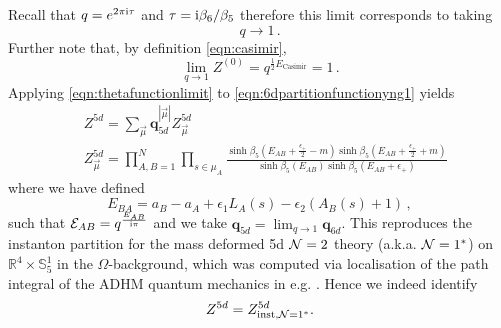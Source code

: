 \documentclass[main.tex]{subfiles}
\begin{document}
Recall that $q=e^{2\pi\mathrm{i}\tau}$ and $\tau=\mathrm{i}\beta_6/\beta_5$ therefore this limit corresponds to taking
\begin{equation}
q\to1\,.
\end{equation}
Further note that, by definition \eqref{eqn:casimir}, 
\begin{equation}
\lim_{q\to1}Z^{(0)}=q^{\frac{1}{2}E_{\text{Casimir}}}=1\,.
\end{equation}
Applying \eqref{eqn:thetafunctionlimit} to \eqref{eqn:6dpartitionfunctionyng1} yields
\begin{align}
&Z^{5d}=\sum_{\vec{\mu}}\mathbf{q}_{5d}^{|\vec{\mu}|}Z_{\vec{\mu}}^{5d}\\
&Z_{\vec{\mu}}^{5d}=\prod_{A,B=1}^N\prod_{s\in \mu_A}\frac{\sinh\beta_5\left(E_{AB}+\frac{\epsilon_+}{2}-m\right)\sinh\beta_5\left(E_{AB}+\frac{\epsilon_+}{2}+m\right)}{\sinh\beta_5\left(E_{AB}\right)\sinh\beta_5\left(E_{AB}+\epsilon_+\right)}\label{5dpartitionfunctionyng}
\end{align}
where we have defined
\begin{equation}
E_{BA}=a_B-a_A+\epsilon_1L_A(s)-\epsilon_2\left(A_B(s)+1\right)\,,
\end{equation}
such that $\mathcal{E}_{AB}=q^{\frac{E_{AB}}{\mathrm{i}\pi}}$ and we take $\mathbf{q}_{5d}=\lim_{q\to1}\mathbf{q}_{6d}$.
 This reproduces the instanton partition for the mass deformed 5d $\mathcal{N}=2$ theory (a.k.a. $\mathcal{N}=1^*$) on $\mathbb{R}^4\times \mathbb{S}^1_5$ in the $\Omega$-background, which was computed via localisation of the path integral of the ADHM quantum mechanics in e.g. \cite{Hwang:2014uwa,Kim:2011mv,Hori:2014tda}.
Hence we indeed identify
\begin{equation}
Z^{5d}=Z^{5d}_{\text{inst},\mathcal{N}=1^*}.
\end{equation}
\end{document}
